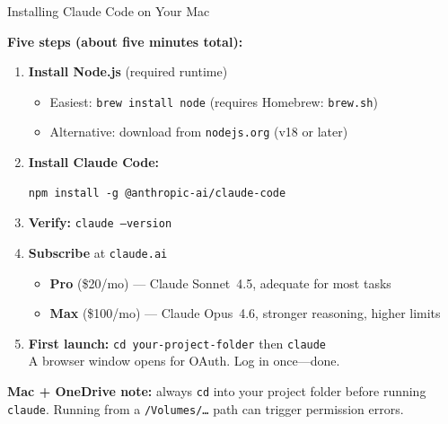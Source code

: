 \documentclass[10pt,english,aspectratio=169]{beamer}
\begin{document}
\begin{frame}[fragile]{Installing Claude Code on Your Mac}

\textbf{Five steps (about five minutes total):}

\vspace{0.15cm}

\begin{enumerate}
    \item \textbf{Install Node.js} (required runtime)
    \begin{itemize}
        \item Easiest: \texttt{brew install node} \quad (requires Homebrew: \texttt{brew.sh})
        \item Alternative: download from \texttt{nodejs.org} (v18 or later)
    \end{itemize}

    \vspace{0.1cm}

    \item \textbf{Install Claude Code:}
\begin{lstlisting}[style=pythonstyle,language={},basicstyle=\ttfamily\scriptsize,numbers=none]
npm install -g @anthropic-ai/claude-code
\end{lstlisting}

    \item \textbf{Verify:} \texttt{claude --version}

    \vspace{0.1cm}

    \item \textbf{Subscribe} at \texttt{claude.ai}

    \vspace{0.05cm}

    \begin{itemize}
        \footnotesize
        \item \textbf{Pro} (\$20/mo) --- Claude Sonnet~4.5, adequate for most tasks
        \item \textbf{Max} (\$100/mo) --- Claude Opus~4.6, stronger reasoning, higher limits
    \end{itemize}

    \vspace{0.1cm}

    \item \textbf{First launch:} \texttt{cd your-project-folder} then \texttt{claude}\\
    A browser window opens for OAuth. Log in once---done.
\end{enumerate}

\vspace{0.15cm}

\textbf{Mac + OneDrive note:} always \texttt{cd} into your project folder before running \texttt{claude}.
Running from a \texttt{/Volumes/\ldots} path can trigger permission errors.
\end{frame}
\end{document}
